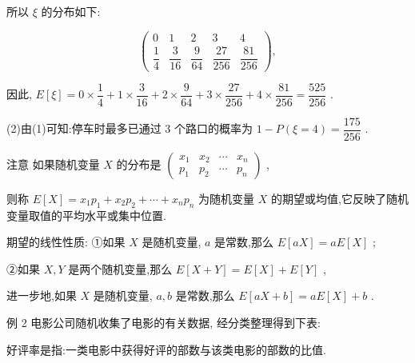所以 $\xi$ 的分布如下:

\[
\left( \begin{matrix} 0 & 1 & 2 & 3 & 4 \\  \dfrac{1}{4} & \dfrac{3}{16} & \dfrac{9}{64} & \dfrac{27}{256} & \dfrac{81}{256} \end{matrix}\right) ,
\]

因此, $E\left\lbrack  \xi \right\rbrack   = 0 \times  \dfrac{1}{4} + 1 \times  \dfrac{3}{16} + 2 \times  \dfrac{9}{64} + 3 \times  \dfrac{27}{256} + 4 \times  \dfrac{81}{256} = \dfrac{525}{256}$ .

(2)由(1)可知:停车时最多已通过 3 个路口的概率为 $1 - P\left( {\xi  = 4}\right)  = \dfrac{175}{256}$ .

注意 如果随机变量 $X$ 的分布是 $\left( \begin{array}{llll} {x}_{1} & {x}_{2} & \cdots & {x}_{n} \\  {p}_{1} & {p}_{2} & \cdots & {p}_{n} \end{array}\right)$ ,

则称 $E\left\lbrack  X\right\rbrack   = {x}_{1}{p}_{1} + {x}_{2}{p}_{2} + \cdots  + {x}_{n}{p}_{n}$ 为随机变量 $X$ 的期望或均值,它反映了随机变量取值的平均水平或集中位置.

期望的线性性质: ①如果 $X$ 是随机变量, $a$ 是常数,那么 $E\left\lbrack  {aX}\right\rbrack   = {aE}\left\lbrack  X\right\rbrack$ ;

②如果 $X,Y$ 是两个随机变量,那么 $E\left\lbrack  {X + Y}\right\rbrack   = E\left\lbrack  X\right\rbrack   + E\left\lbrack  Y\right\rbrack$ ,

进一步地,如果 $X$ 是随机变量, $a,b$ 是常数,那么 $E\left\lbrack  {{aX} + b}\right\rbrack   = {aE}\left\lbrack  X\right\rbrack   + b$ .

例 2 电影公司随机收集了电影的有关数据, 经分类整理得到下表:

\begin{center}
\end{center}

好评率是指:一类电影中获得好评的部数与该类电影的部数的比值.

